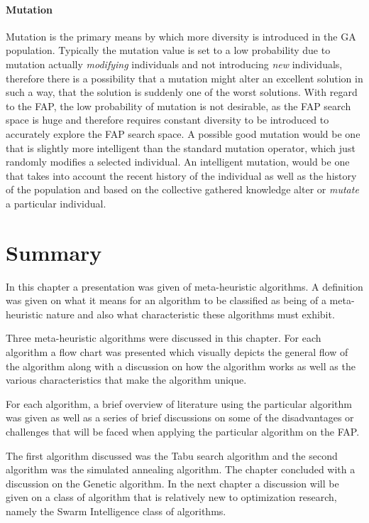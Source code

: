 \paragraph{Mutation}
Mutation is the primary means by which more diversity is introduced in the GA population. Typically the mutation value is set to a low probability due to mutation actually \emph{modifying} individuals and not introducing \emph{new} individuals, therefore there is a possibility that a mutation might alter an excellent solution in such a way, that the solution is suddenly one of the worst solutions. With regard to the FAP, the low probability of mutation is not desirable, as the FAP search space is huge and therefore requires constant diversity to be introduced to accurately explore the FAP search space. A possible good mutation would be one that is slightly more intelligent than the standard mutation operator, which just randomly modifies a selected individual. An intelligent mutation, would be one that takes into account the recent history of the individual as well as the history of the population and based on the collective gathered knowledge alter or \emph{mutate} a particular individual.
\section {Summary}
In this chapter a presentation was given of meta-heuristic algorithms. A definition was given on what it means for an algorithm to be classified as being of a meta-heuristic nature and also what characteristic these algorithms must exhibit.

Three meta-heuristic algorithms were discussed in this chapter. For each algorithm a flow chart was presented which visually depicts the general flow of the algorithm along with a discussion on how the algorithm works as well as the various characteristics that make the algorithm unique.

For each algorithm, a brief overview of literature using the particular algorithm was given as well as a series of brief discussions on some of the disadvantages or challenges that will be faced when applying the particular algorithm on the FAP.

The first algorithm discussed was the Tabu search algorithm and the second algorithm was the simulated annealing algorithm. The chapter concluded with a discussion on the Genetic algorithm. In the next chapter a discussion will be given on a class of algorithm that is relatively new to optimization research, namely the Swarm Intelligence class of algorithms.

